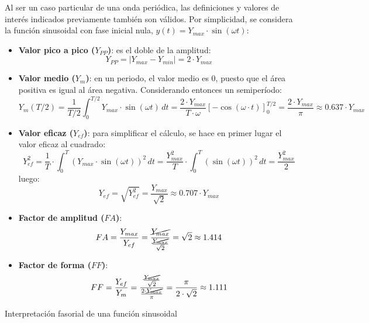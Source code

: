 \documentclass[11pt]{book} %
\makeatletter
\numberwithin{dummy}{section}
\theoremstyle{ocrenumbox}
\theoremstyle{blacknumex}
\theoremstyle{blacknumbox}
\theoremstyle{ocrenum}
\renewcommand{\subsubsection}{\@startsection {subsubsection}{3}{\z@}
{-2ex \@plus -0.1ex \@minus -.2ex}
{.2ex \@plus.2ex }
{\normalfont\small\sffamily\bfseries}}
\makeatother
\begin{document}
	Al ser un caso particular de una onda periódica, las definiciones y valores de interés indicados previamente también son válidos. Por simplicidad, se considera la función sinusoidal con fase inicial nula, $y(t)=Y_{max}\cdot\sin(\omega t)$:
	\begin{itemize}
		\item \textbf{Valor pico a pico ($Y_{PP}$)}: es el doble de la amplitud: 
		\begin{equation*}
			Y_{PP}=|Y_{max} - Y_{min}|=2\cdot Y_{max}
		\end{equation*}
		\item \textbf{Valor medio ($Y_m$)}: en un periodo, el valor medio es 0, puesto que el área positiva es igual al área negativa. Considerando entonces un semiperíodo: 
		\begin{equation*}
			Y_m(T/2)=\frac{1}{T/2}\int_{0}^{T/2} Y_{max}\cdot \sin(\omega t)\, dt=\dfrac{2\cdot Y_{max}}{T\cdot\omega}\left[-\cos(\omega\cdot t)\right]_0^{T/2} =\dfrac{2\cdot Y_{max}}{\pi}\approx 0.637\cdot Y_{max}
		\end{equation*}
		\item \textbf{Valor eficaz ($Y_{ef}$)}: para simplificar el cálculo, se hace en primer lugar el valor eficaz al cuadrado:
		\begin{equation*}
			Y_{ef}^2=\dfrac{1}{T}\cdot\int_{0}^{T}\left(Y_{max}\cdot\sin(\omega  t)\right)^{2}\,dt=\dfrac{Y_{max}^2}{T}\cdot\int_{0}^{T}\left(\sin(\omega t)\right)^{2}\,dt=\dfrac{Y_{max}^2}{2}
		\end{equation*}
		luego:
		\begin{equation*}
			Y_{ef}=\sqrt{Y_{ef}^2}=\dfrac{Y_{max}}{\sqrt{2}}\approx0.707\cdot Y_{max}
		\end{equation*}
		\item \textbf{Factor de amplitud ($FA$)}: 
		\begin{equation*}
			FA = \dfrac{Y_{max}}{Y_{ef}}=\dfrac{\cancel{Y_{max}}}{\frac{\cancel{Y_{max}}}{\sqrt{2}}}=\sqrt{2}\approx 1.414
		\end{equation*}
		\item \textbf{Factor de forma ($FF$)}: 
		\begin{equation*}
			FF = \dfrac{Y_{ef}}{Y_{m}} = \dfrac{\frac{\cancel{Y_{max}}}{\sqrt{2}}}{\frac{2\cdot \cancel{Y_{max}}}{\pi}}=\dfrac{\pi}{2\cdot\sqrt{2}}\approx 1.111
		\end{equation*}
	\end{itemize}
	
	\subsubsection{Interpretación fasorial de una función sinusoidal}
	
\end{document}
